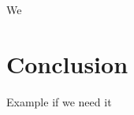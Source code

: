 \documentclass[twocolumn,showpacs,%
  nofootinbib,aps,superscriptaddress,%
  eqsecnum,prd,notitlepage,showkeys,10pt]{revtex4-1}
\begin{document}
We 
\section{Conclusion}







\begin{thebibliography}{9}

 Example if we need it





\end{thebibliography}
\end{document}
